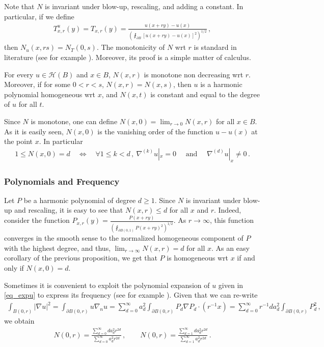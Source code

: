 \documentclass[11pt]{article}
\begin{document}
Note that $N$ is invariant under blow-up, rescaling, and adding a constant.  In particular, if we define
\begin{gather}\label{eq_dephT}
 T_{x,r}^u(y) = T_{x,r}(y)= \frac{u(x+ry)-u(x)}{{\left({\fint_{\partial B} [u(x+ry)-u(x)]^2  }\right)}^{1/2}}\, ,
\end{gather}
then $N_u(x,rs)=N_T (0,s)$.  The monotonicity of $N$ wrt $r$ is standard in literature (see for example \cite{hanlin}). Moreover, its proof is a simple matter of calculus.
\begin{proposition}
 For every $u\in {\mathcal{H}}(B)$ and $x\in B$, $N(x,r)$ is monotone non decreasing wrt $r$. Moreover, if for some $0<r<s$, $N(x,r)=N(x,s)$, then $u$ is a harmonic polynomial homogeneous wrt $x$, and $N(x,t)$ is constant and equal to the degree of $u$ for all $t$.
\end{proposition}
Since $N$ is monotone, one can define $N(x,0)=\lim_{r\to 0} N(x,r)$ for all $x\in B$. As it is easily seen, $N(x,0)$ is the vanishing order of the function $u-u(x)$ at the point $x$. In particular
\begin{gather}
 1\leq N(x,0)=d \quad \Longleftrightarrow \quad \forall 1\leq k <d\, , \ \nabla ^{(k)} u|_x =0  \quad \text{  and  } \quad \nabla ^{(d)}u|_x\neq 0\, .
\end{gather}

\subsubsection{Polynomials and Frequency} \label{ss:freq_poly_exp}
Let $P$ be a harmonic polynomial of degree $d\geq 1$. Since $N$ is invariant under blow-up and rescaling, it is easy to see that $N(x,r)\leq d$ for all $x$ and $r$. Indeed, consider the function $P_{x,r}(y) = \frac{P(x+ry)}{{\left({\fint_{\partial B(0,1) } P(x+ry)^2  }\right)}^{1/2} } $. As $r\to \infty$, this function converges in the smooth sense to the normalized homogeneous component of $P$ with the highest degree, and thus, $\lim_{r\to \infty} N(x,r)=d$ for all $x$. As an easy corollary of the previous proposition, we get that $P$ is homogeneous wrt $x$ if and only if $N(x,0)=d$.

Sometimes it is convenient to exploit the polynomial expansion of $u$ given in \eqref{eq_expu} to express its frequency (see for example \cite[p 23]{hanlin}). Given that we can re-write
\begin{gather}
 \int_{B(0,r)}{\left|{\nabla u}\right|}^2 = \int_{\partial B(0,r)} u \nabla_n u = \sum_{d=0}^\infty a_d^2 \int_{\partial B(0,r)} P_d \nabla P_d \cdot (r^{-1}x) = \sum_{d=0}^\infty r^{-1} d a_d^2\int_{\partial B(0,r)} P_d^2 \, ,
\end{gather}
we obtain
\begin{gather}
 N(0,r)= \frac{\sum_{d=0}^{\infty} d a_d^2 r^{2d} }{\sum_{d=0}^{\infty} a_d^2 r^{2d}}\, , \quad \quad N(0,r)= \frac{\sum_{d=1}^{\infty} d a_d^2 r^{2d} }{\sum_{d=1}^{\infty} a_d^2 r^{2d}}\, .
\end{gather}
\end{document}
